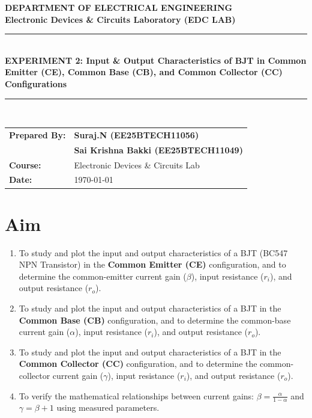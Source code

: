 \documentclass[11pt,a4paper]{article}
\begin{document}
\begin{center}
    {\LARGE \textbf{\color{primary} DEPARTMENT OF ELECTRICAL ENGINEERING}}\\[0.2cm]
    {\large \textbf{Electronic Devices \& Circuits Laboratory (EDC LAB)}}\\[0.4cm]
    \rule{\linewidth}{1pt}\\[0.3cm]
    {\Large \textbf{EXPERIMENT 2: Input \& Output Characteristics of BJT in Common Emitter (CE), Common Base (CB), and Common Collector (CC) Configurations}}\\[0.3cm]
    \rule{\linewidth}{1pt}\\[0.4cm]
    
    \begin{tabular}{ll}
      \textbf{Prepared By:} & \textbf{Suraj.N (EE25BTECH11056)} \\
                            & \textbf{Sai Krishna Bakki (EE25BTECH11049)} \\
        \textbf{Course:} & Electronic Devices \& Circuits Lab \\
        \textbf{Date:} & \today
    \end{tabular}
\end{center}

\vspace{0.3cm}

\section{Aim}
\begin{enumerate}
    \item To study and plot the input and output characteristics of a BJT (BC547 NPN Transistor) in the \textbf{Common Emitter (CE)} configuration, and to determine the common-emitter current gain (\textbf{$\beta$}), input resistance (\textbf{$r_i$}), and output resistance (\textbf{$r_o$}).
    \item To study and plot the input and output characteristics of a BJT in the \textbf{Common Base (CB)} configuration, and to determine the common-base current gain (\textbf{$\alpha$}), input resistance (\textbf{$r_i$}), and output resistance (\textbf{$r_o$}).
    \item To study and plot the input and output characteristics of a BJT in the \textbf{Common Collector (CC)} configuration, and to determine the common-collector current gain (\textbf{$\gamma$}), input resistance (\textbf{$r_i$}), and output resistance (\textbf{$r_o$}).
    \item To verify the mathematical relationships between current gains: \textbf{$\beta = \frac{\alpha}{1-\alpha}$} and \textbf{$\gamma = \beta + 1$} using measured parameters.
\end{enumerate}
\end{document}
